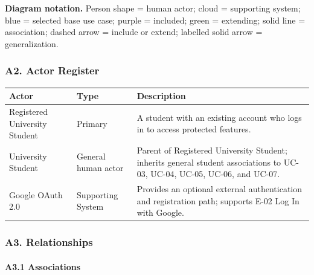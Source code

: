 \documentclass[12pt]{article}
\renewcommand{\baselinestretch}{1.5}
\begin{document}
\textbf{Diagram notation.} Person shape = human actor; cloud = supporting system; blue = selected base use case; purple = included; green = extending; solid line = association; dashed arrow = include or extend; labelled solid arrow = generalization.
\par\medskip

\hypertarget{sec:a2-actor-register}{}
\subsubsection*{A2. Actor Register}
\par\medskip

\begingroup
\small
\renewcommand{\baselinestretch}{1.0}\selectfont
\renewcommand{\arraystretch}{1.15}
\setlength{\tabcolsep}{6pt}
\begin{longtable}{|>{\raggedright\arraybackslash}p{}|>{\raggedright\arraybackslash}p{}|>{\raggedright\arraybackslash}p{}|}
\hline
\textbf{Actor} & \textbf{Type} & \textbf{Description} \\ \hline
\endhead
Registered University Student & Primary & A student with an existing account who logs in to access protected features. \\ \hline
University Student & General human actor & Parent of Registered University Student; inherits general student associations to UC-03, UC-04, UC-05, UC-06, and UC-07. \\ \hline
Google OAuth 2.0 & Supporting System & Provides an optional external authentication and registration path; supports E-02 Log In with Google. \\ \hline
\end{longtable}
\endgroup
\par\medskip

\hypertarget{sec:a3-relationships}{}
\subsubsection*{A3. Relationships}
\par\medskip

\hypertarget{sec:a3-1-associations}{}
\paragraph*{A3.1 Associations}
\par\medskip
\end{document}
